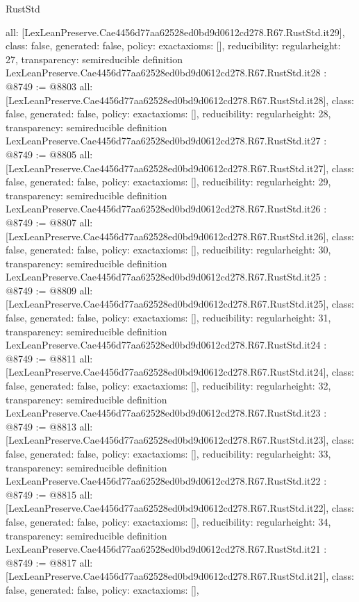 \begin{lexlean}{RustStd}
\begin{coremodule}
{  all: [LexLeanPreserve.Cae4456d77aa62528ed0bd9d0612cd278.R67.RustStd.it29],
  class: false,
  generated: false,
  policy: exact{axioms: []},
  reducibility: regular{height: 27},
  transparency: semireducible
}
definition LexLeanPreserve.Cae4456d77aa62528ed0bd9d0612cd278.R67.RustStd.it28 : @8749 := @8803 {
  all: [LexLeanPreserve.Cae4456d77aa62528ed0bd9d0612cd278.R67.RustStd.it28],
  class: false,
  generated: false,
  policy: exact{axioms: []},
  reducibility: regular{height: 28},
  transparency: semireducible
}
definition LexLeanPreserve.Cae4456d77aa62528ed0bd9d0612cd278.R67.RustStd.it27 : @8749 := @8805 {
  all: [LexLeanPreserve.Cae4456d77aa62528ed0bd9d0612cd278.R67.RustStd.it27],
  class: false,
  generated: false,
  policy: exact{axioms: []},
  reducibility: regular{height: 29},
  transparency: semireducible
}
definition LexLeanPreserve.Cae4456d77aa62528ed0bd9d0612cd278.R67.RustStd.it26 : @8749 := @8807 {
  all: [LexLeanPreserve.Cae4456d77aa62528ed0bd9d0612cd278.R67.RustStd.it26],
  class: false,
  generated: false,
  policy: exact{axioms: []},
  reducibility: regular{height: 30},
  transparency: semireducible
}
definition LexLeanPreserve.Cae4456d77aa62528ed0bd9d0612cd278.R67.RustStd.it25 : @8749 := @8809 {
  all: [LexLeanPreserve.Cae4456d77aa62528ed0bd9d0612cd278.R67.RustStd.it25],
  class: false,
  generated: false,
  policy: exact{axioms: []},
  reducibility: regular{height: 31},
  transparency: semireducible
}
definition LexLeanPreserve.Cae4456d77aa62528ed0bd9d0612cd278.R67.RustStd.it24 : @8749 := @8811 {
  all: [LexLeanPreserve.Cae4456d77aa62528ed0bd9d0612cd278.R67.RustStd.it24],
  class: false,
  generated: false,
  policy: exact{axioms: []},
  reducibility: regular{height: 32},
  transparency: semireducible
}
definition LexLeanPreserve.Cae4456d77aa62528ed0bd9d0612cd278.R67.RustStd.it23 : @8749 := @8813 {
  all: [LexLeanPreserve.Cae4456d77aa62528ed0bd9d0612cd278.R67.RustStd.it23],
  class: false,
  generated: false,
  policy: exact{axioms: []},
  reducibility: regular{height: 33},
  transparency: semireducible
}
definition LexLeanPreserve.Cae4456d77aa62528ed0bd9d0612cd278.R67.RustStd.it22 : @8749 := @8815 {
  all: [LexLeanPreserve.Cae4456d77aa62528ed0bd9d0612cd278.R67.RustStd.it22],
  class: false,
  generated: false,
  policy: exact{axioms: []},
  reducibility: regular{height: 34},
  transparency: semireducible
}
definition LexLeanPreserve.Cae4456d77aa62528ed0bd9d0612cd278.R67.RustStd.it21 : @8749 := @8817 {
  all: [LexLeanPreserve.Cae4456d77aa62528ed0bd9d0612cd278.R67.RustStd.it21],
  class: false,
  generated: false,
  policy: exact{axioms: []},
}
\end{coremodule}
\end{lexlean}
